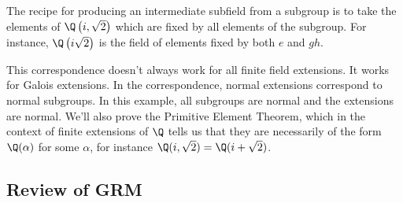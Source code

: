 \documentclass{article}
\begin{document}
\begin{center}
\end{center}

The recipe for producing an intermediate subfield from a subgroup is to take the elements of $\Q\left(i, \sqrt{2}\right)$ which are fixed by all elements of the subgroup.
For instance, $\Q\left(i \sqrt{2}\right)$ is the field of elements fixed by both $e$ and $gh$.

This correspondence doesn't always work for all finite field extensions.  It works for Galois extensions.
In the correspondence, normal extensions correspond to normal subgroups.
In this example, all subgroups are normal and the extensions are normal.
We'll also prove the Primitive Element Theorem, which in the context of finite extensions of $\Q$ tells us that they are necessarily of the form $\Q(\alpha)$ for some $\alpha$, for instance $\Q(i, \sqrt{2}) = \Q(i + \sqrt{2})$.

\subsection{Review of GRM}
\end{document}
